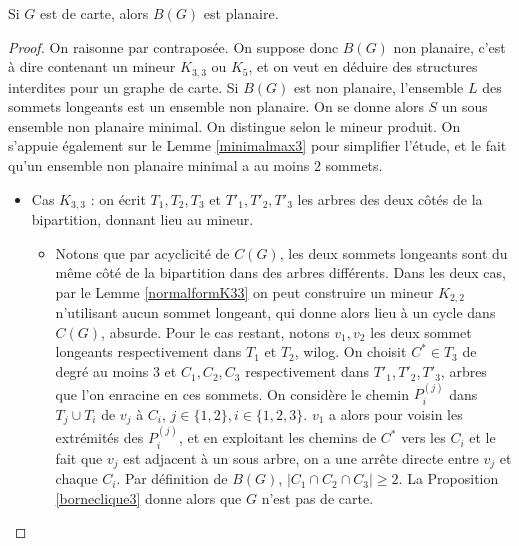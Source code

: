 \documentclass{scrartcl}
\begin{document}
\begin{flushleft}
\begin{prop}
    Si $G$ est de carte, alors $B(G)$ est planaire.
\end{prop}

\begin{proof}
    On raisonne par contraposée. On suppose donc $B(G)$ non planaire, c'est à dire contenant
    un mineur $K_{3,3}$ ou $K_5$, et on veut en déduire des structures interdites
    pour un graphe de carte.
    \newline \newline
    Si $B(G)$ est non planaire, l'ensemble $L$ des sommets longeants est un ensemble non planaire.
    On se donne alors $S$ un sous ensemble non planaire minimal. On distingue selon le mineur
    produit. On s'appuie également sur le Lemme \ref{minimalmax3} pour simplifier l'étude,
    et le fait qu'un ensemble non planaire minimal a au moins $2$ sommets.
    \begin{itemize}
        \item Cas $K_{3,3}$ : on écrit $T_1, T_2, T_3$ et $T'_1, T'_2, T'_3$ les arbres des
        deux côtés de la bipartition, donnant lieu au mineur.
        \begin{itemize}
            \item[Si $|S| = 2$ :] Notons que par acyclicité de $C(G)$, les deux sommets
            longeants sont du même côté de la bipartition dans des arbres différents. Dans
            les deux cas, par le Lemme \ref{normalformK33} on peut construire un mineur
            $K_{2,2}$ n'utilisant aucun sommet longeant, qui donne alors lieu à un cycle dans
            $C(G)$, absurde. Pour le cas restant, notons $v_1, v_2$ les deux sommet longeants
            respectivement dans $T_1$ et $T_2$, wilog. On choisit $C^* \in T_3$ de degré
            au moins $3$ et
            $C_1, C_2, C_3$ respectivement dans $T'_1, T'_2, T'_3$, arbres que l'on
            enracine en ces sommets. On considère le chemin $P^{(j)}_i$ dans
            $T_j \cup T_i$ de $v_j$ à $C_i$, $j \in \{1,2\}, i \in \{1,2,3\}$. $v_1$ a alors
            pour voisin les extrémités des $P^{(j)}_i$, et en exploitant les chemins
            de $C^*$ vers les $C_i$ et le fait que $v_j$ est adjacent à un sous arbre,
            on a une arrête directe entre $v_j$ et chaque $C_i$. Par définition de $B(G)$,
            $|C_1 \cap C_2 \cap C_3| \geq 2$. La Proposition \ref{borneclique3} donne
            alors que $G$ n'est pas de carte.


\end{itemize}
\end{itemize}
\end{proof}
\end{flushleft}
\end{document}
